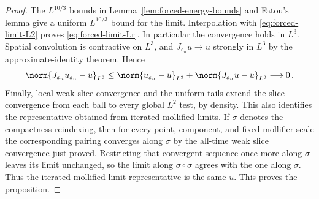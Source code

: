 \documentclass[11pt,reqno]{amsart}
\begin{document}
\begin{proof}
The $L^{10/3}$ bounds in Lemma~\ref{lem:forced-energy-bounds} and Fatou's
lemma give a uniform $L^{10/3}$ bound for the limit. Interpolation with
\eqref{eq:forced-limit-L2} proves \eqref{eq:forced-limit-Lr}. In
particular the convergence holds in $L^3$. Spatial convolution is
contractive on $L^3$, and $J_{\varepsilon_n}u\to u$ strongly in $L^3$
by the approximate-identity theorem. Hence
\[
 \norm{J_{\varepsilon_n}u_{\varepsilon_n}-u}_{L^3}
 \le\norm{u_{\varepsilon_n}-u}_{L^3}
     +\norm{J_{\varepsilon_n}u-u}_{L^3}\longrightarrow0\,.
\]
Finally, local weak slice convergence and the uniform tails extend the slice convergence from each ball to every global $L^2$ test, by density. This also identifies the representative obtained from iterated mollified limits. If $\sigma$ denotes the compactness reindexing, then for every point, component, and fixed mollifier scale the corresponding pairing converges along $\sigma$ by the all-time weak slice convergence just proved. Restricting that convergent sequence once more along $\sigma$ leaves its limit unchanged, so the limit along $\sigma\circ\sigma$ agrees with the one along $\sigma$. Thus the iterated mollified-limit representative is the same $u$. This proves the proposition.
\end{proof}
\end{document}

